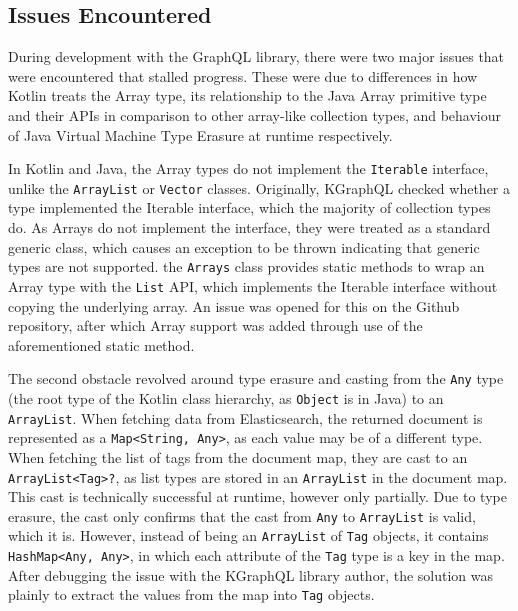 \documentclass[12pt,pdftex,titlepage]{report}
\begin{document}
            \subsection{Issues Encountered}
                During development with the GraphQL library, there were two major issues that were encountered that stalled progress. These were due to differences in how Kotlin treats the Array type, its
                relationship to the Java Array primitive type and their APIs in comparison to other array-like collection types, and behaviour of Java Virtual Machine Type Erasure\cite{typeerasure} at runtime respectively.
                
                \smallskip
                In Kotlin and Java, the Array types do not implement the \texttt{Iterable} interface, unlike the \texttt{ArrayList} or \texttt{Vector} classes. Originally, KGraphQL checked whether a type implemented the 
                Iterable interface, which the majority of collection types do. As Arrays do not implement the interface, they were treated as a standard generic class, which causes an exception to be thrown indicating 
                that generic types are not supported. the \texttt{Arrays} class provides static methods to wrap an Array type with the \texttt{List} API, which implements the Iterable interface without copying the 
                underlying array. An issue was opened for this on the Github repository, after which Array support was added through use of the aforementioned static method.

                The second obstacle revolved around type erasure and casting from the \texttt{Any} type (the root type of the Kotlin class hierarchy, as \texttt{Object} is in Java) to an \texttt{ArrayList}. When fetching data from 
                Elasticsearch, the returned document is represented as a \texttt{Map<String, Any>}, as each value may be of a different type. When fetching the list of tags from the document map, they are cast to an 
                \texttt{ArrayList<Tag>?}, as list types are stored in an \texttt{ArrayList} in the document map. This cast is technically successful at runtime, however only partially. Due to type erasure, the cast only 
                confirms that the cast from \texttt{Any} to \texttt{ArrayList} is valid, which it is. However, instead of being an \texttt{ArrayList} of \texttt{Tag} objects, it contains \texttt{HashMap<Any, Any>}, in which 
                each attribute of the \texttt{Tag} type is a key in the map. After debugging the issue with the KGraphQL library author, the solution was plainly to extract the values from the map into \texttt{Tag} objects.
            
\end{document}
